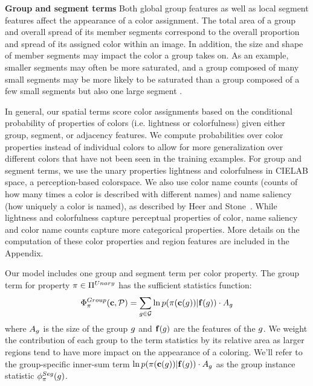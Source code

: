 \textbf{Group and segment terms}
Both global group features as well as local segment features affect the appearance of a color assignment. The total area of a group and overall spread of its member segments correspond to the overall proportion and spread of its assigned color within an image. In addition, the size and shape of member segments may impact the color a group takes on. As an example, smaller segments may often be more saturated, and a group composed of many small segments may be more likely to be saturated than a group composed of a few small segments but also one large segment .   

In general, our spatial terms score color assignments based on the conditional probability of properties of colors (i.e. lightness or colorfulness) given either group, segment, or adjacency features. We compute probabilities over color properties instead of individual colors to allow for more generalization over different colors that have not been seen in the training examples. For group and segment terms, we use the unary properties lightness and colorfulness in CIELAB space, a perception-based colorspace. We also use color name counts (counts of how many times a color is described with different names) and name saliency (how uniquely a color is named), as described by Heer and Stone~. While lightness and colorfulness capture perceptual properties of color, name saliency and color name counts capture more categorical properties. More details on the computation of these color properties and region features are included in the Appendix.

Our model includes one group and segment term per color property. The group term for property $\pi \in \Pi^{Unary}$ has the sufficient statistics function:
\begin{equation*}
 \Phi^{Group}_\pi(\mathbf{c}, \mathcal{P}) = \sum_{g \in \mathcal{G}} \ln p( \pi( \mathbf{c}(g) ) | \mathbf{f}(g)) \cdot A_g
\end{equation*}
where $A_g$ is the size of the group $g$ and $\mathbf{f}(g)$ are the features of the $g$. We weight the contribution of each group to the term statistics by its relative area as larger regions tend to have more impact on the appearance of a coloring. We'll refer to the group-specific inner-sum term $\ln p( \pi( \mathbf{c}(g) ) | \mathbf{f}(g)) \cdot A_g$ as the group instance statistic $\phi^{Seg}_\pi(g)$. 

